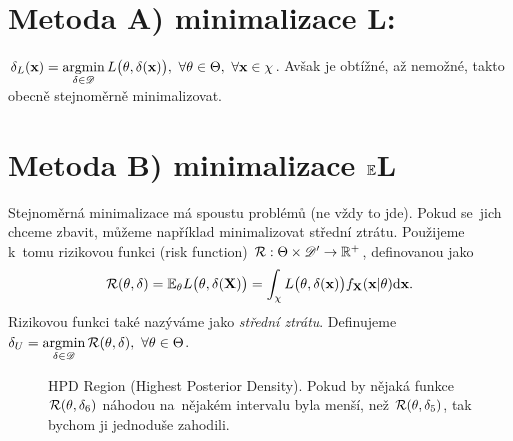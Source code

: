 \section{Metoda A) minimalizace L:} $\delta_L(\textbf{x})=\mathop{\mathrm{argmin}}\limits_{\delta\in\mathscr{D}} L\big(\theta,\delta(\textbf{x})\big),~\forall \theta\in\Theta,~\forall\textbf{x}\in\chi$. Avšak je obtížné, až nemožné, takto obecně stejnoměrně minimalizovat.

\section{Metoda B) minimalizace $\mathbb{E} $L}
Stejnoměrná minimalizace má spoustu problémů (ne vždy to jde). Pokud se~jich chceme zbavit, můžeme například minimalizovat střední ztrátu. Použijeme k~tomu rizikovou funkci (risk function) $\mathcal{R}:\Theta\times\mathscr{D}' \to\mathbb{R}^+$, definovanou jako $$\mathcal{R}(\theta,\delta)=\mathbb{E}_\theta L\big(\theta,\delta(\textbf{X})\big)=\int_\chi L\big(\theta,\delta(\textbf{x})\big)f_\textbf{X}(\textbf{x}|\theta)\mathrm{d}\textbf{x}.$$
Rizikovou funkci také nazýváme jako \textit{střední ztrátu}. Definujeme $\delta_U=\mathop{\mathrm{argmin}}\limits_{\delta\in\mathscr{D}} \mathcal{R}(\theta,\delta),~\forall\theta\in\Theta$.

\begin{figure}[h]
	\centering
	\caption{HPD Region (Highest Posterior Density). Pokud by nějaká funkce $ \mathcal{R} (\theta, \delta_6 )
		$ náhodou na~nějakém intervalu byla menší, než $ \mathcal{R} (\theta, \delta_5 )
		$, tak bychom ji jednoduše zahodili.}\label{HPD}
\end{figure}


